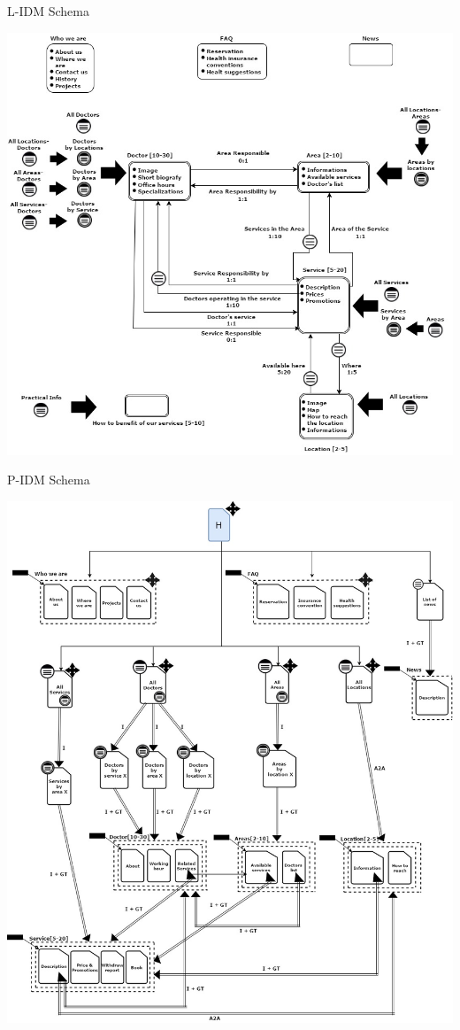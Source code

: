 \documentclass{../Common/Structure/doc_pdf}
\begin{document}
\centering L-IDM Schema
\vspace{1cm}
\begin{center}
	\includegraphics[width=\textwidth]{Clinic_L_IDM.jpg}
\end{center}

\newpage

\centering P-IDM Schema
\vspace{1cm}
\begin{center}
	\includegraphics[width=\textwidth]{Clinic_P_IDM.jpg}
\end{center}
\end{document}
